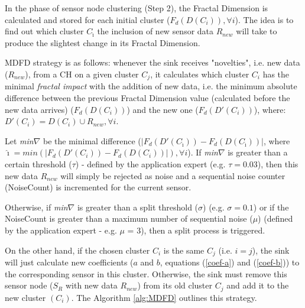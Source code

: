 \documentclass{acm_proc_article-sp}
\begin{document}
In the phase of sensor node clustering (Step 2), the Fractal Dimension is 
calculated and stored for each initial cluster
($F_{d}(D(C_i)), \forall i$). The idea is to find out which cluster
$C_{\hat{\imath}}$ the inclusion of new sensor data $R_{new}$ will take to produce
the slightest change in its Fractal Dimension.
\vspace*{-.3cm}

MDFD strategy is as follows:
whenever the sink receives "novelties", i.e. new data ($R_{new}$), from a CH on
a given cluster $C_j$, it calculates which cluster $C_i$ has the minimal
\textit{fractal impact} with the addition of new data, i.e. the minimum absolute
difference between the previous Fractal Dimension value (calculated before the
new data arrives) ($F_d(D(C_i))$) and the new one ($F_d(D'(C_i))$), where:
$D'(C_i) = D(C_i) \cup R_{new}, \forall i$.
\vspace*{-.3cm}

Let {\it min}$\nabla$ be the minimal difference ($|F_d(D'(C_{\hat{\imath}})) -
F_d(D(C_{\hat{\imath}}))|$, where $\hat{\imath} = min(|F_d(D'(C_i)) - F_d(D(C_i))|),
\forall i$). If {\it min}$\nabla$ is greater than a certain threshold ($\tau$) -
defined by the application expert (e.g. $\tau = 0.03$), then this new data
$R_{new}$ will simply be rejected as noise and a sequential noise counter
(NoiseCount) is incremented for the current sensor.
\vspace*{-.3cm}

Otherwise, if {\it min}$\nabla$ is greater than a split threshold ($\sigma$)
(e.g. $\sigma = 0.1$) or if the NoiseCount is greater than a maximum number of
sequential noise ($\mu$) (defined by the application expert - e.g. $\mu$ = 3),
then a split process is triggered.
\vspace*{-.3cm}

On the other hand, if the chosen cluster $C_i$ is the same $C_j$ (i.e.
$i=j$), the sink will just calculate new coefficients ($a$ and $b$, equations
(\ref{coef-a}) and (\ref{coef-b})) to the corresponding sensor in this cluster.
Otherwise, the sink must remove this sensor node ($S_{R}$ with new data
$R_{new}$) from its old cluster $C_j$ and add it to the new cluster $(C_i)$.
The Algorithm \ref{alg:MDFD} outlines this strategy.
\end{document}
